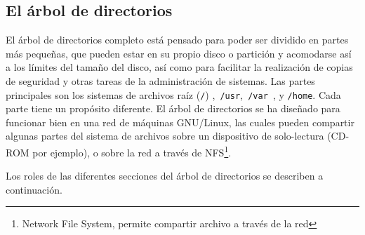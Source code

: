\documentclass[12pt]{article}
\begin{document}
\subsection*{El árbol de directorios}
El árbol de directorios completo está pensado para poder ser dividido en
partes más pequeñas, que pueden estar en su propio disco o partición y
acomodarse así a los límites del tamaño del disco, así como para facilitar la
realización de  copias de seguridad y otras tareas de la administración de
sistemas. Las partes principales son los sistemas de archivos raíz
(\texttt{/}) ,\texttt{ /usr},\texttt{ /var
}, y \texttt{/home}. Cada parte tiene un propósito
diferente. El árbol de directorios se ha diseñado para funcionar bien en una red
de máquinas GNU/Linux, las cuales pueden compartir algunas partes del sistema de
archivos sobre un dispositivo de solo-lectura (CD-ROM por ejemplo), o sobre la
red a través de NFS\footnote{Network File System, permite compartir archivo a través
de la red}.  

 Los roles de las diferentes secciones del árbol de directorios se
describen a continuación.  
\end{document}
